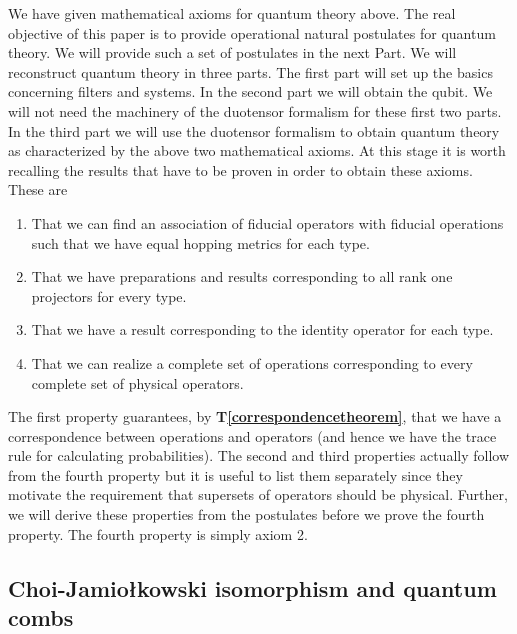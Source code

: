 \documentclass[10pt]{article}
\begin{document}
We have given mathematical axioms for quantum theory above. The real objective of this paper is to provide operational natural postulates for quantum theory.  We will provide such a set of postulates in the next Part.   We will reconstruct quantum theory in three parts.  The first part will set up the basics concerning filters and systems.  In the second part we will obtain the qubit.  We will not need the machinery of the duotensor formalism for these first two parts.  In the third part we will use the duotensor formalism to obtain quantum theory as characterized by the above two mathematical axioms.   At this stage it is worth recalling the results that have to be proven in order to obtain these axioms.  These are
\begin{enumerate}
\item That we can find an association of fiducial operators with fiducial operations such that we have equal hopping metrics for each type.
\item That we have preparations and results corresponding to  all rank one projectors for every type.
\item That we have a result corresponding to the identity operator for each type.
\item That we can realize a complete set of operations corresponding to every complete set of physical operators.
\end{enumerate}
The first property guarantees, by {\bf T\ref{correspondencetheorem}}, that we have a correspondence between operations and operators (and hence we have the trace rule for calculating probabilities).  The second and third properties actually follow from the fourth property but it is useful to list them separately since they motivate the requirement that supersets of operators should be physical.  Further, we will derive these properties from the postulates before we prove the fourth property.  The fourth property is simply axiom 2.

\subsection{Choi-Jamio\l kowski isomorphism and quantum combs}\label{combs}
\end{document}
